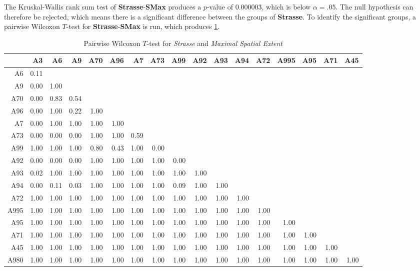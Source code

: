 The Kruskal-Wallis rank sum test of \textbf{Strasse}-\textbf{SMax} produces a $p$-value of 0.000003, which is below $\alpha=.05$. The null hypothesis can therefore be rejected, which means there is a significant difference between the groups of \textbf{Strasse}. To identify the significant groups, a pairwise Wilcoxon $T$-test for \textbf{Strasse}-\textbf{SMax} is run, which produces \cref{tbl:wilcoxon_baysis_matched_Strasse_SMax}.
\begin{table}[ht]
	\tiny
	\setlength{\tabcolsep}{4pt}
	\centering
	\begin{tabular}{rrrrrrrrrrrrrrrrr}
		\toprule
				& A3   & A6   & A9   & A70  & A96  & A7   & A73   & A99 & A92 & A93 & A94 & A72 & A995 & A95 & A71 & A45 \\ 
		\midrule
		A6 		& 0.11 &  &  &  &  &  &  &  &  &  &  &  &  &  &  &  \\ 
		A9 		& 0.00 & 1.00 &  &  &  &  &  &  &  &  &  &  &  &  &  &  \\ 
		A70 	& 0.00 & 0.83 & 0.54 &  &  &  &  &  &  &  &  &  &  &  &  &  \\ 
		A96 	& 0.00 & 1.00 & 0.22 & 1.00 &  &  &  &  &  &  &  &  &  &  &  &  \\ 
		A7 		& 0.00 & 1.00 & 1.00 & 1.00 & 1.00 &  &  &  &  &  &  &  &  &  &  &  \\ 
		A73 	& 0.00 & 0.00 & 0.00 & 1.00 & 1.00 & 0.59 &  &  &  &  &  &  &  &  &  &  \\ 
		A99 	& 1.00 & 1.00 & 1.00 & 0.80 & 0.43 & 1.00 & 0.00 &  &  &  &  &  &  &  &  &  \\ 
		A92 	& 0.00 & 0.00 & 0.00 & 1.00 & 1.00 & 1.00 & 1.00 & 0.00 &  &  &  &  &  &  &  &  \\ 
		A93 	& 0.02 & 1.00 & 1.00 & 1.00 & 1.00 & 1.00 & 1.00 & 1.00 & 1.00 &  &  &  &  &  &  &  \\ 
		A94 	& 0.00 & 0.11 & 0.03 & 1.00 & 1.00 & 1.00 & 1.00 & 0.09 & 1.00 & 1.00 &  &  &  &  &  &  \\ 
		A72 	& 1.00 & 1.00 & 1.00 & 1.00 & 1.00 & 1.00 & 1.00 & 1.00 & 1.00 & 1.00 & 1.00 &  &  &  &  &  \\ 
		A995 	& 1.00 & 1.00 & 1.00 & 1.00 & 1.00 & 1.00 & 1.00 & 1.00 & 1.00 & 1.00 & 1.00 & 1.00 &  &  &  &  \\ 
		A95 	& 1.00 & 1.00 & 1.00 & 1.00 & 1.00 & 1.00 & 1.00 & 1.00 & 1.00 & 1.00 & 1.00 & 1.00 & 1.00 &  &  &  \\ 
		A71 	& 1.00 & 1.00 & 1.00 & 1.00 & 1.00 & 1.00 & 1.00 & 1.00 & 1.00 & 1.00 & 1.00 & 1.00 & 1.00 & 1.00 &  &  \\ 
		A45 	& 1.00 & 1.00 & 1.00 & 1.00 & 1.00 & 1.00 & 1.00 & 1.00 & 1.00 & 1.00 & 1.00 & 1.00 & 1.00 & 1.00 & 1.00 &  \\ 
		A980 	& 1.00 & 1.00 & 1.00 & 1.00 & 1.00 & 1.00 & 1.00 & 1.00 & 1.00 & 1.00 & 1.00 & 1.00 & 1.00 & 1.00 & 1.00 & 1.00 \\ 
		\bottomrule
	\end{tabular}
	\caption{Pairwise Wilcoxon $T$-test for \textit{Strasse} and \textit{Maximal Spatial Extent}}
	\label{tbl:wilcoxon_baysis_matched_Strasse_SMax}
\end{table}
